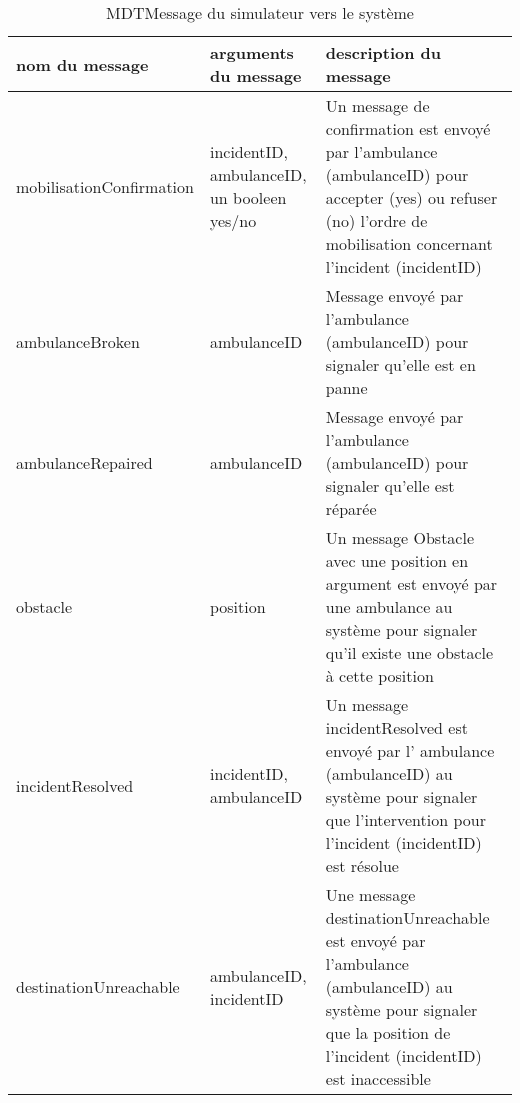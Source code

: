 \begin{table}[!h]
	\centering
	\begin{tabularx}{\marginparsep+\marginparwidth+\marginparpush+\textwidth}{|l|X|X|}
		\hline
		\textbf{nom du message} & \textbf{arguments du message} & \textbf{description du message} \\ \hline
		mobilisationConfirmation & incidentID, ambulanceID, un booleen yes/no & Un message de confirmation est envoyé par l'ambulance (ambulanceID) pour accepter (yes) ou refuser (no) l'ordre de mobilisation concernant l'incident (incidentID) \\ \hline 
		ambulanceBroken & ambulanceID & Message envoyé par l'ambulance (ambulanceID) pour signaler qu'elle est en panne \\ \hline
		ambulanceRepaired & ambulanceID & Message envoyé par l'ambulance (ambulanceID) pour signaler qu'elle est réparée \\ \hline
		obstacle & position & Un message Obstacle avec une position en argument est envoyé par une ambulance au système pour signaler qu'il existe une obstacle à cette position \\ \hline
		incidentResolved & incidentID, ambulanceID & Un message incidentResolved est envoyé par l' ambulance (ambulanceID) au système pour signaler que l'intervention pour l'incident (incidentID) est résolue \\ \hline
		destinationUnreachable & ambulanceID, incidentID & Une message destinationUnreachable est envoyé par l'ambulance (ambulanceID) au système pour signaler que la position de l'incident (incidentID) est inaccessible \\ \hline
	\end{tabularx} 
	\caption{MDTMessage du simulateur vers le système}
	\label{tab:MDTMessage}
\end{table}
